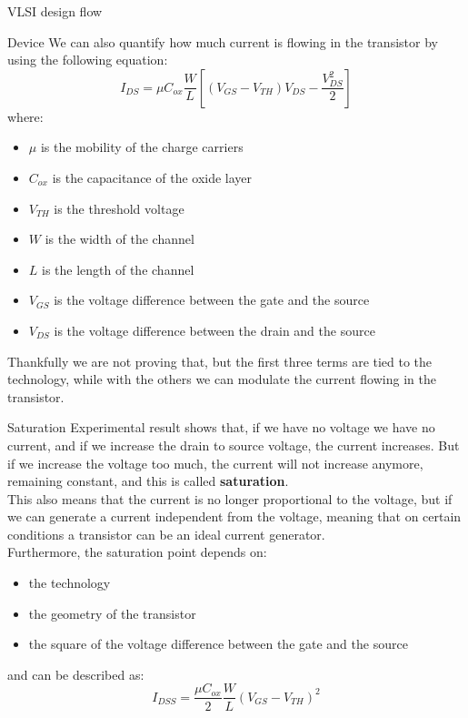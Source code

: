 \begin{section}{VLSI design flow}
\begin{subsection}{Device}
    We can also quantify how much current is flowing in the transistor by using the following
    equation:
    \begin{equation}
      I_{DS} = \mu C_{ox} \frac{W}{L} [(V_{GS} - V_{TH}) V_{DS} - \frac{V_{DS}^2}{2}]
      \label{eq:current}
    \end{equation}
    where:
    \begin{itemize}
      \item $\mu$ is the mobility of the charge carriers
      \item $C_{ox}$ is the capacitance of the oxide layer
      \item $V_{TH}$ is the threshold voltage
      \item $W$ is the width of the channel
      \item $L$ is the length of the channel
      \item $V_{GS}$ is the voltage difference between the gate and the source
      \item $V_{DS}$ is the voltage difference between the drain and the source
    \end{itemize}
    Thankfully we are not proving that, but the first three terms are tied to the technology, while 
    with the others we can modulate the current flowing in the transistor.
    \begin{subsubsection}{Saturation}
      Experimental result shows that, if we have no voltage we have no current, and if we increase
      the drain to source voltage, the current increases. But if we increase the voltage too much, 
      the current will not increase anymore, remaining constant, and this is called 
      \textbf{saturation}.\\
      This also means that the current is no longer proportional to the voltage, but if we can generate
      a current independent from the voltage, meaning that on certain conditions a transistor can be
      an ideal current generator.\\
      Furthermore, the saturation point depends on:
      \begin{itemize}
        \item the technology
        \item the geometry of the transistor
        \item the square of the voltage difference between the gate and the source
      \end{itemize}
      and can be described as:
      \begin{equation}
        I_{DSS} = \frac{\mu C_{ox}}{2} \frac{W}{L} (V_{GS} - V_{TH})^2

\end{equation}
\end{subsubsection}
\end{subsection}
\end{section}
